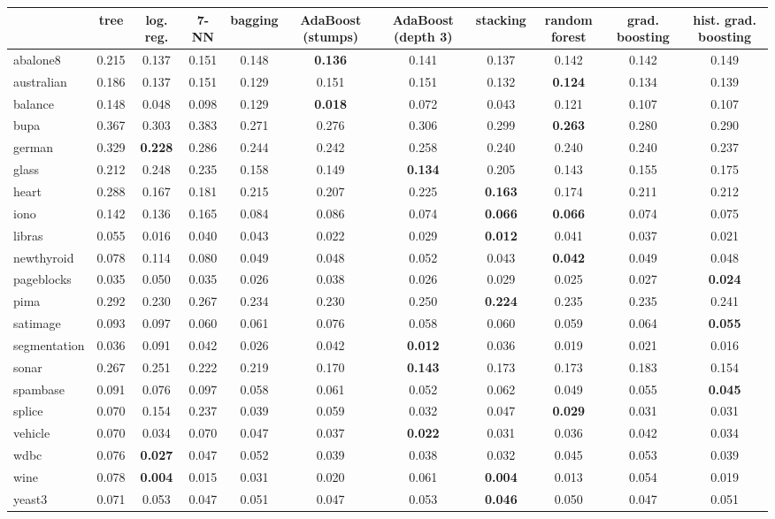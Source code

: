 \begin{tabular}{lcccccccccc}
\toprule
 & tree & log. reg. & 7-NN & bagging & AdaBoost (stumps) & AdaBoost (depth 3) & stacking & random forest & grad. boosting & hist. grad. boosting \\
\midrule
abalone8 & 0.215 & 0.137 & 0.151 & 0.148 & \textbf{0.136} & 0.141 & 0.137 & 0.142 & 0.142 & 0.149 \\
australian & 0.186 & 0.137 & 0.151 & 0.129 & 0.151 & 0.151 & 0.132 & \textbf{0.124} & 0.134 & 0.139 \\
balance & 0.148 & 0.048 & 0.098 & 0.129 & \textbf{0.018} & 0.072 & 0.043 & 0.121 & 0.107 & 0.107 \\
bupa & 0.367 & 0.303 & 0.383 & 0.271 & 0.276 & 0.306 & 0.299 & \textbf{0.263} & 0.280 & 0.290 \\
german & 0.329 & \textbf{0.228} & 0.286 & 0.244 & 0.242 & 0.258 & 0.240 & 0.240 & 0.240 & 0.237 \\
glass & 0.212 & 0.248 & 0.235 & 0.158 & 0.149 & \textbf{0.134} & 0.205 & 0.143 & 0.155 & 0.175 \\
heart & 0.288 & 0.167 & 0.181 & 0.215 & 0.207 & 0.225 & \textbf{0.163} & 0.174 & 0.211 & 0.212 \\
iono & 0.142 & 0.136 & 0.165 & 0.084 & 0.086 & 0.074 & \textbf{0.066} & \textbf{0.066} & 0.074 & 0.075 \\
libras & 0.055 & 0.016 & 0.040 & 0.043 & 0.022 & 0.029 & \textbf{0.012} & 0.041 & 0.037 & 0.021 \\
newthyroid & 0.078 & 0.114 & 0.080 & 0.049 & 0.048 & 0.052 & 0.043 & \textbf{0.042} & 0.049 & 0.048 \\
pageblocks & 0.035 & 0.050 & 0.035 & 0.026 & 0.038 & 0.026 & 0.029 & 0.025 & 0.027 & \textbf{0.024} \\
pima & 0.292 & 0.230 & 0.267 & 0.234 & 0.230 & 0.250 & \textbf{0.224} & 0.235 & 0.235 & 0.241 \\
satimage & 0.093 & 0.097 & 0.060 & 0.061 & 0.076 & 0.058 & 0.060 & 0.059 & 0.064 & \textbf{0.055} \\
segmentation & 0.036 & 0.091 & 0.042 & 0.026 & 0.042 & \textbf{0.012} & 0.036 & 0.019 & 0.021 & 0.016 \\
sonar & 0.267 & 0.251 & 0.222 & 0.219 & 0.170 & \textbf{0.143} & 0.173 & 0.173 & 0.183 & 0.154 \\
spambase & 0.091 & 0.076 & 0.097 & 0.058 & 0.061 & 0.052 & 0.062 & 0.049 & 0.055 & \textbf{0.045} \\
splice & 0.070 & 0.154 & 0.237 & 0.039 & 0.059 & 0.032 & 0.047 & \textbf{0.029} & 0.031 & 0.031 \\
vehicle & 0.070 & 0.034 & 0.070 & 0.047 & 0.037 & \textbf{0.022} & 0.031 & 0.036 & 0.042 & 0.034 \\
wdbc & 0.076 & \textbf{0.027} & 0.047 & 0.052 & 0.039 & 0.038 & 0.032 & 0.045 & 0.053 & 0.039 \\
wine & 0.078 & \textbf{0.004} & 0.015 & 0.031 & 0.020 & 0.061 & \textbf{0.004} & 0.013 & 0.054 & 0.019 \\
yeast3 & 0.071 & 0.053 & 0.047 & 0.051 & 0.047 & 0.053 & \textbf{0.046} & 0.050 & 0.047 & 0.051 \\
\bottomrule
\end{tabular}
